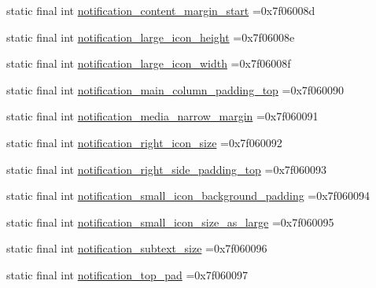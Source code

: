 \begin{DoxyCompactItemize}
\item 
static final int \mbox{\hyperlink{classbr_1_1unb_1_1cic_1_1mp_1_1marketmaster_1_1R_1_1dimen_abc5a7deb7196314ddbeec1d117563db9}{notification\+\_\+content\+\_\+margin\+\_\+start}} =0x7f06008d
\item 
static final int \mbox{\hyperlink{classbr_1_1unb_1_1cic_1_1mp_1_1marketmaster_1_1R_1_1dimen_a1663544ec4de8489c08a282823719445}{notification\+\_\+large\+\_\+icon\+\_\+height}} =0x7f06008e
\item 
static final int \mbox{\hyperlink{classbr_1_1unb_1_1cic_1_1mp_1_1marketmaster_1_1R_1_1dimen_a9ed539c37326a0cc603cf08177993540}{notification\+\_\+large\+\_\+icon\+\_\+width}} =0x7f06008f
\item 
static final int \mbox{\hyperlink{classbr_1_1unb_1_1cic_1_1mp_1_1marketmaster_1_1R_1_1dimen_a93f8505a1b3c260d010031d075316282}{notification\+\_\+main\+\_\+column\+\_\+padding\+\_\+top}} =0x7f060090
\item 
static final int \mbox{\hyperlink{classbr_1_1unb_1_1cic_1_1mp_1_1marketmaster_1_1R_1_1dimen_af3b7c1a38911e94fea01b75213bdf9be}{notification\+\_\+media\+\_\+narrow\+\_\+margin}} =0x7f060091
\item 
static final int \mbox{\hyperlink{classbr_1_1unb_1_1cic_1_1mp_1_1marketmaster_1_1R_1_1dimen_a259185c0e561e33cb8db5d75b49adce5}{notification\+\_\+right\+\_\+icon\+\_\+size}} =0x7f060092
\item 
static final int \mbox{\hyperlink{classbr_1_1unb_1_1cic_1_1mp_1_1marketmaster_1_1R_1_1dimen_adba34377ad76524ef6cf2d308c300977}{notification\+\_\+right\+\_\+side\+\_\+padding\+\_\+top}} =0x7f060093
\item 
static final int \mbox{\hyperlink{classbr_1_1unb_1_1cic_1_1mp_1_1marketmaster_1_1R_1_1dimen_a4a4613b3bee18c1e82d8d5bae73334f5}{notification\+\_\+small\+\_\+icon\+\_\+background\+\_\+padding}} =0x7f060094
\item 
static final int \mbox{\hyperlink{classbr_1_1unb_1_1cic_1_1mp_1_1marketmaster_1_1R_1_1dimen_acc74e82ca1abf00c93695d3084e50aa0}{notification\+\_\+small\+\_\+icon\+\_\+size\+\_\+as\+\_\+large}} =0x7f060095
\item 
static final int \mbox{\hyperlink{classbr_1_1unb_1_1cic_1_1mp_1_1marketmaster_1_1R_1_1dimen_af10a9239104356435fa5ad90bc0c5127}{notification\+\_\+subtext\+\_\+size}} =0x7f060096
\item 
static final int \mbox{\hyperlink{classbr_1_1unb_1_1cic_1_1mp_1_1marketmaster_1_1R_1_1dimen_a00a50b03757901579b79122fa3c6db8c}{notification\+\_\+top\+\_\+pad}} =0x7f060097

\end{DoxyCompactItemize}
